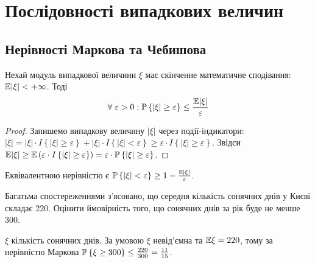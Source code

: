 \section{Послідовності випадкових величин}
\subsection{Нерівності Маркова та Чебишова}
\begin{theorem*}
    Нехай модуль випадкової величини $\xi$ має скінченне математичне сподівання: $\E|\xi| < +\infty$.
    Тоді 
    \begin{gather}\label{Markov_ineq}
        \forall \; \varepsilon >0 : \P\left\{ |\xi| \geq \varepsilon\right\} \leq \frac{\E|\xi|}{\varepsilon}
    \end{gather}
\end{theorem*}
\begin{proof}
    Запишемо випадкову величину $|\xi|$ через події-індикатори: 
    $|\xi| = |\xi|\cdot I\left\{|\xi| \geq \varepsilon\right\} + |\xi|\cdot I\left\{|\xi| < \varepsilon\right\} \geq
    \varepsilon\cdot I\left\{|\xi| \geq \varepsilon\right\}$. Звідси $\E|\xi| \geq \E \left( \varepsilon\cdot I\left\{|\xi| \geq \varepsilon\right\}\right) =
    \varepsilon \cdot \P\left\{ |\xi| \geq \varepsilon\right\}$.
\end{proof}
\begin{remark}
    Еквівалентною нерівністю є $\P\left\{ |\xi| < \varepsilon\right\} \geq 1 - \frac{\E|\xi|}{\varepsilon}$.
\end{remark}

\begin{example}
    Багатьма спостереженнями з'ясовано, що середня кількість
    сонячних днів у Києві складає 220. Оцінити ймовірність того, що
    сонячних днів за рік буде не менше 300.

     $\xi$ кількість сонячних днів. За умовою $\xi$ невід'ємна та $\E\xi = 220$,
    тому за нерівністю Маркова $\P\left\{ \xi \geq 300\right\} \leq \frac{220}{300} = \frac{11}{15}$.
\end{example}

